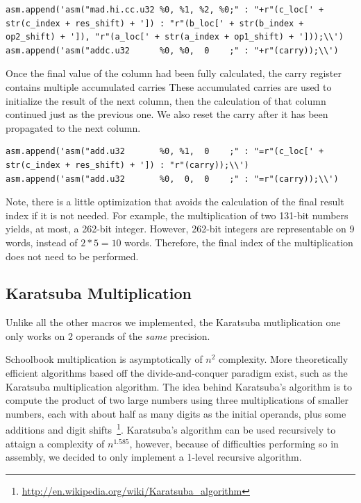 \documentclass[12pt, a4paper]{report}
\begin{document}
\begin{sloppypar}
\begin{enumerate}
\begin{lstlisting}
asm.append('asm("mad.hi.cc.u32 %0, %1, %2, %0;" : "+r"(c_loc[' + str(c_index + res_shift) + ']) : "r"(b_loc[' + str(b_index + op2_shift) + ']), "r"(a_loc[' + str(a_index + op1_shift) + ']));\\')
asm.append('asm("addc.u32      %0, %0,  0    ;" : "+r"(carry));\\')
\end{lstlisting}
Once the final value of the column had been fully calculated, the carry register contains
multiple accumulated carries
These accumulated carries are used to initialize the result of the next column,
then the calculation of that column continued just as the previous one.
We also reset the carry after it has been propagated to the next column.

\begin{lstlisting}
asm.append('asm("add.u32       %0, %1,  0    ;" : "=r"(c_loc[' + str(c_index + res_shift) + ']) : "r"(carry));\\')
asm.append('asm("add.u32       %0,  0,  0    ;" : "=r"(carry));\\')
\end{lstlisting}
\end{enumerate}

Note, there is a little optimization that avoids the calculation of the final
result index if it is not needed.
For example, the multiplication of two 131-bit numbers yields, at most, a
262-bit integer.
However, 262-bit integers are representable on 9 words, instead of
$2*5 = 10$ words.
Therefore, the final index of the multiplication does not need to be performed.

\subsection{Karatsuba Multiplication}
Unlike all the other macros we implemented, the Karatsuba mutliplication one
only works on 2 operands of the \emph{same} precision.

Schoolbook multiplication is asymptotically of $n^2$ complexity.
More theoretically efficient algorithms based off the divide-and-conquer
paradigm exist, such as the Karatsuba multiplication algorithm.
The idea behind Karatsuba's algorithm is to compute the product of two large
numbers using three multiplications of smaller numbers, each with about half as
many digits as the initial operands, plus some additions and digit shifts~\footnote{\url{http://en.wikipedia.org/wiki/Karatsuba_algorithm}}.
Karatsuba's algorithm can be used recursively to attaign a complexity of
$n^{1.585}$, however, because of difficulties performing so in assembly, we
decided to only implement a 1-level recursive algorithm.


\end{sloppypar}
\end{document}
